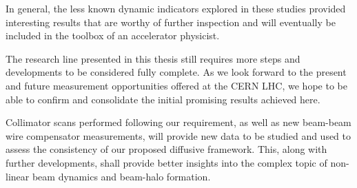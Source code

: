 In general, the less known dynamic indicators explored in these studies provided interesting results that are worthy of further inspection and will eventually be included in the toolbox of an accelerator physicist.

The research line presented in this thesis still requires more steps and developments to be considered fully complete. As we look forward to the present and future measurement opportunities offered at the CERN LHC, we hope to be able to confirm and consolidate the initial promising results achieved here.

Collimator scans performed following our requirement, as well as new beam-beam wire compensator measurements, will provide new data to be studied and used to assess the consistency of our proposed diffusive framework. This, along with further developments, shall provide better insights into the complex topic of non-linear beam dynamics and beam-halo formation.



